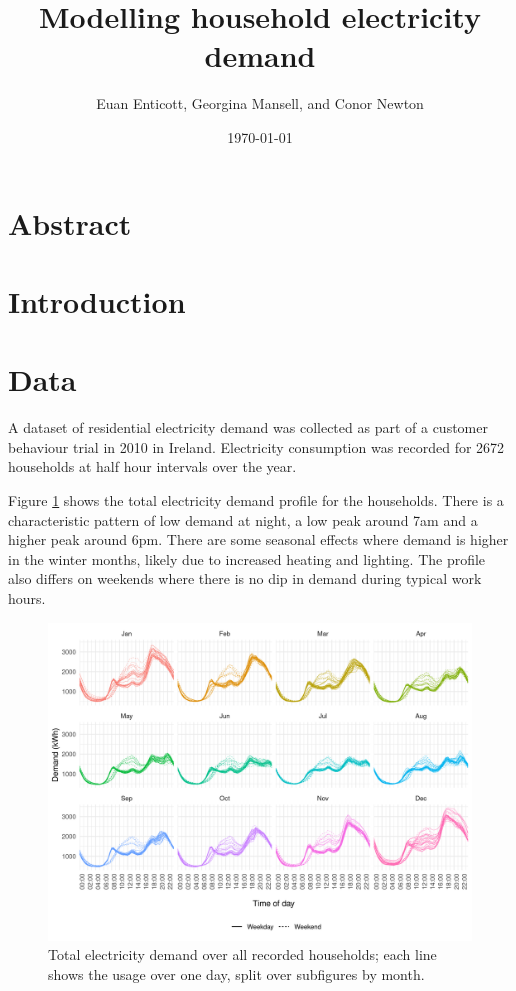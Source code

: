 \documentclass[11pt,a4paper]{article}
\begin{document}
\title{Modelling household electricity demand}
\author{Euan Enticott, Georgina Mansell, and Conor Newton}
\date{\today}

\maketitle
 
\section*{Abstract}


\section{Introduction}

\section{Data} \label{data}
A dataset of residential electricity demand was collected as part of a customer behaviour trial in 2010 in Ireland. Electricity consumption was recorded for 2672 households at half hour intervals over the year.

Figure \ref{fig:totalusage} shows the total electricity demand profile for the households. There is a characteristic pattern of low demand at night, a low peak around 7am and a higher peak around 6pm. There are some seasonal effects where demand is higher in the winter months, likely due to increased heating and lighting. The profile also differs on weekends where there is no dip in demand during typical work hours.

\begin{figure}[ht]
\centering
\includegraphics[width=1\linewidth]{TotalUsage}
\caption{Total electricity demand over all recorded households; each line shows the usage over one day, split over subfigures by month.}
\label{fig:totalusage}
\end{figure}
\end{document}
